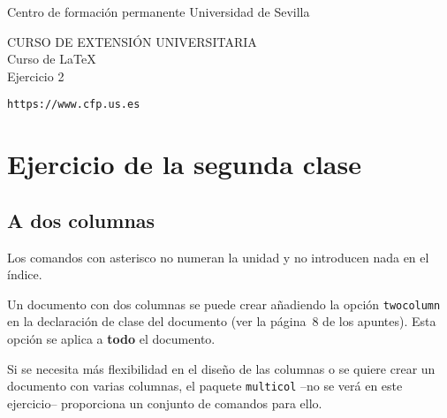 \documentclass[a4paper,twocolumn]{report}
\begin{document}

\begin{titlepage}
\bfseries

Centro de formación permanente \hfill Universidad de Sevilla

\vfill

\begin{center}

CURSO DE EXTENSIÓN UNIVERSITARIA \\[1cm]

{\Huge Curso de \LaTeX} \\[1cm]


{\large Ejercicio 2}

\end{center}

\vfill

\begin{flushright}

{\mdseries \texttt{https://www.cfp.us.es}}

\end{flushright}

\end{titlepage}

\chapter*{Ejercicio de la segunda clase}

\section*{A dos columnas}


Los comandos con asterisco no numeran la unidad y no introducen nada en el índice. 

Un documento con dos columnas se puede crear añadiendo la opción \texttt{twocolumn} en la declaración de clase del documento (ver la página~8 de los apuntes). Esta opción se aplica a \textbf{todo} el documento. 

Si se necesita más flexibilidad en el diseño de las columnas o se quiere crear un documento con varias columnas, el paquete \texttt{multicol} --no se verá en este ejercicio-- proporciona un conjunto de comandos para ello. 
\end{document}
